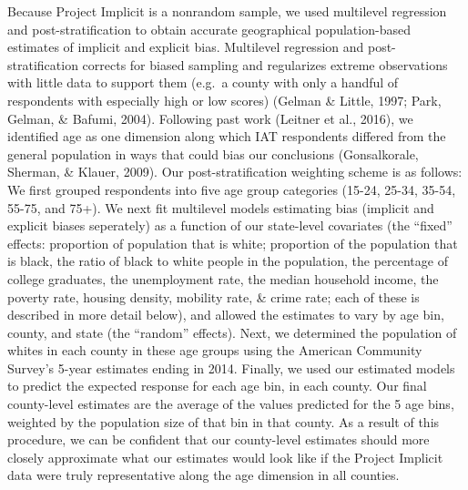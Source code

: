 \documentclass[english,floatsintext,man]{apa6}
\theoremstyle{definition}
\theoremstyle{definition}
\theoremstyle{remark}
\begin{document}
Because Project Implicit is a nonrandom sample, we used multilevel
regression and post-stratification to obtain accurate geographical
population-based estimates of implicit and explicit bias. Multilevel
regression and post-stratification corrects for biased sampling and
regularizes extreme observations with little data to support them
(e.g.~a county with only a handful of respondents with especially high
or low scores) (Gelman \& Little, 1997; Park, Gelman, \& Bafumi, 2004).
Following past work (Leitner et al., 2016), we identified age as one
dimension along which IAT respondents differed from the general
population in ways that could bias our conclusions (Gonsalkorale,
Sherman, \& Klauer, 2009). Our post-stratification weighting scheme is
as follows: We first grouped respondents into five age group categories
(15-24, 25-34, 35-54, 55-75, and 75+). We next fit multilevel models
estimating bias (implicit and explicit biases seperately) as a function
of our state-level covariates (the \enquote{fixed} effects: proportion
of population that is white; proportion of the population that is black,
the ratio of black to white people in the population, the percentage of
college graduates, the unemployment rate, the median household income,
the poverty rate, housing density, mobility rate, \& crime rate; each of
these is described in more detail below), and allowed the estimates to
vary by age bin, county, and state (the \enquote{random} effects). Next,
we determined the population of whites in each county in these age
groups using the American Community Survey's 5-year estimates ending in
2014. Finally, we used our estimated models to predict the expected
response for each age bin, in each county. Our final county-level
estimates are the average of the values predicted for the 5 age bins,
weighted by the population size of that bin in that county. As a result
of this procedure, we can be confident that our county-level estimates
should more closely approximate what our estimates would look like if
the Project Implicit data were truly representative along the age
dimension in all counties.
\end{document}
